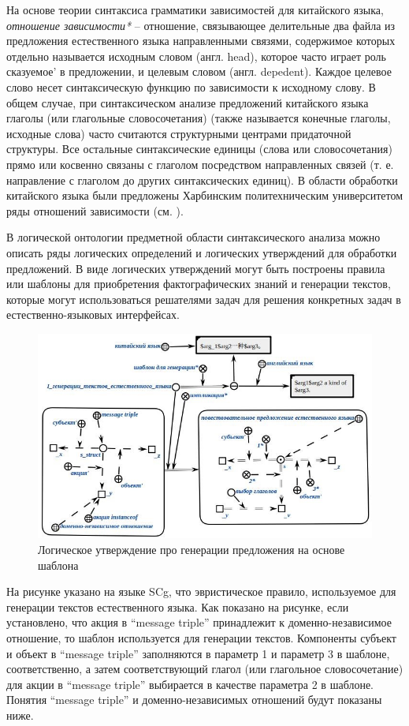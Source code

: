 На основе теории синтаксиса грамматики зависимостей для китайского языка, \textit{отношение зависимости*} -- отношение, связывающее делительные два файла из предложения естественного языка направленными связями, содержимое которых отдельно называется исходным словом (англ. head), которое часто играет роль сказуемое' в предложении, и целевым словом (англ. depedent). Каждое целевое слово несет синтаксическую функцию по зависимости к исходному слову. В общем случае, при синтаксическом анализе предложений китайского языка глаголы (или глагольные словосочетания) (также называется конечные глаголы, исходные слова) часто считаются структурными центрами придаточной структуры. Все остальные синтаксические единицы (слова или словосочетания) прямо или косвенно связаны с глаголом посредством направленных связей (т. е. направление с глаголом до других синтаксических единиц). В области обработки китайского языка были предложены Харбинским политехническим университетом ряды отношений зависимости (см. ).

В логической онтологии предметной области синтаксического анализа можно описать ряды логических определений и логических утверждений для обработки предложений. В виде логических утверждений могут быть построены правила или шаблоны для приобретения фактографических знаний и генерации текстов, которые могут использоваться решателями задач для решения конкретных задач в естественно-языковых интерфейсах.
\begin{figure}[H]
	\centering
	\includegraphics[scale=0.8]{images/part4/chapter_chinese/ruleGeneration.jpg}
	\caption{Логическое утверждение про генерации предложения на основе шаблона}
	\label{fig:template-generation}
\end{figure}

На рисунке \textit{} указано на языке SCg, что эвристическое правило, используемое для генерации текстов естественного языка. Как показано на рисунке, если установлено, что акция в ``message triple'' принадлежит к доменно-независимое отношение, то шаблон используется для генерации текстов. Компоненты субъект и объект в ``message triple'' заполняются в параметр 1 и параметр 3 в шаблоне, соответственно, а затем соответствующий глагол (или глагольное словосочетание) для акции в ``message triple'' выбирается в качестве параметра 2 в шаблоне. Понятия ``message triple'' и доменно-независимых отношений будут показаны ниже.

